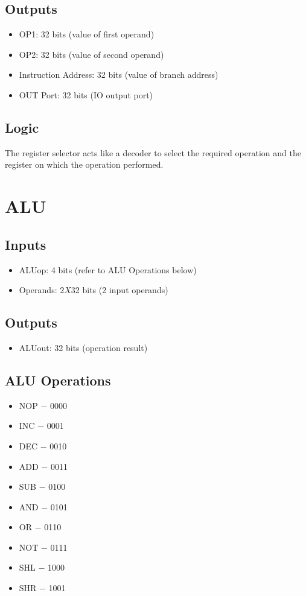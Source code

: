 \documentclass[12pt]{report}
\begin{document}
\subsection{Outputs}
\begin{itemize}
    \item OP1: 32 bits (value of first operand)
    \item OP2: 32 bits (value of second operand)
    \item Instruction Address: 32 bits (value of branch address)
    \item OUT Port: 32 bits (IO output port)
\end{itemize}

\subsection{Logic}
The register selector acts like a decoder to select the required operation and the register on which the operation performed.

\section{ALU}

\subsection{Inputs}
\begin{itemize}
    \item ALUop: 4 bits (refer to ALU Operations below)
    \item Operands: 2$X$32 bits (2 input operands)
\end{itemize}

\subsection{Outputs}
\begin{itemize}
    \item ALUout: 32 bits (operation result)
\end{itemize}

\subsection{ALU Operations}
\begin{itemize}
    \item NOP $-$ 0000
    \item INC $-$ 0001
    \item DEC $-$ 0010
    \item ADD $-$ 0011
    \item SUB $-$ 0100
    \item AND $-$ 0101
    \item OR $-$ 0110
    \item NOT $-$ 0111
    \item SHL $-$ 1000
    \item SHR $-$ 1001
\end{itemize}
\end{document}
